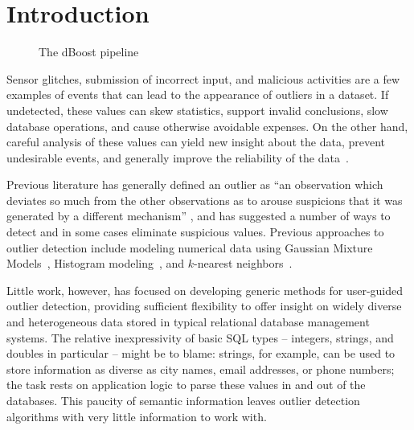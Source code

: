 \section{Introduction}
\label{sec:intro}

\begin{figure*}
  \centering %
  \caption{The dBoost pipeline}
  \label{fig:pipeline}
\end{figure*}

Sensor glitches, submission of incorrect input, and malicious activities are a few examples of events that can lead to the appearance of outliers in a dataset. If undetected, these values can skew statistics, support invalid conclusions, slow database operations, and cause otherwise avoidable expenses. On the other hand, careful analysis of these values can yield new insight about the data, prevent undesirable events, and generally improve the reliability of the data~\cite{Achour2014}.

Previous literature has generally defined an outlier as ``an observation which deviates so much from the other observations as to arouse suspicions that it was generated by a different mechanism'' \cite{Hawkins1980}, and has suggested a number of ways to detect and in some cases eliminate suspicious values. Previous approaches to outlier detection include modeling numerical data using Gaussian Mixture Models~\cite{Lu2005,Roberts1994,Roberts1999}, Histogram modeling~\cite{Gebski2007,Sheng2007}, and $k$-nearest neighbors~\cite{Ramaswamy2000}.

Little work, however, has focused on developing generic methods for user-guided outlier detection, providing sufficient flexibility to offer insight on widely diverse and heterogeneous data stored in typical relational database management systems. The relative inexpressivity of basic SQL types -- integers, strings, and doubles in particular -- might be to blame: strings, for example, can be used to store information as diverse as city names, email addresses, or phone numbers; the task rests on application logic to parse these values in and out of the databases. This paucity of semantic information leaves outlier detection algorithms with very little information to work with.

